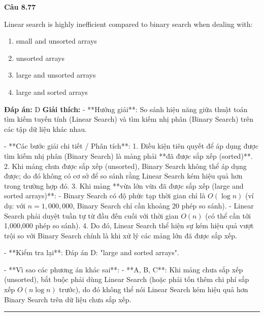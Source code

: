 \documentclass[11pt,a4paper]{article}
\newenvironment{question}[1]{%
  \par\vspace{1em}\noindent\textbf{\large Câu #1}\par\vspace{0.4em}
}{%
  \par\vspace{1em}\hrule\vspace{0.6em}
}
\newenvironment{choices}{%
  \begin{enumerate}[label=\textbf{\Alph*.},leftmargin=2.2em,itemsep=2pt,topsep=3pt]
}{%
  \end{enumerate}
}
\newcommand{\choice}{\item}
\begin{document}
\begin{question}{8.77}
Linear search is highly inefficient compared to binary search when dealing with:
\begin{choices}
\choice small and unsorted arrays
\choice unsorted arrays
\choice large and unsorted arrays
\choice large and sorted arrays
\end{choices}
\textbf{Đáp án:} D
\textbf{Giải thích:} - **Hướng giải**:
  So sánh hiệu năng giữa thuật toán tìm kiếm tuyến tính (Linear Search) và tìm kiếm nhị phân (Binary Search) trên các tập dữ liệu khác nhau.

- **Các bước giải chi tiết / Phân tích**:
  1. Điều kiện tiên quyết để áp dụng được tìm kiếm nhị phân (Binary Search) là mảng phải **đã được sắp xếp (sorted)**.
  2. Khi mảng chưa được sắp xếp (unsorted), Binary Search không thể áp dụng được; do đó không có cơ sở để so sánh rằng Linear Search kém hiệu quả hơn trong trường hợp đó.
  3. Khi mảng **vừa lớn vừa đã được sắp xếp (large and sorted arrays)**:
     - Binary Search có độ phức tạp thời gian chỉ là \(O(\log n)\) (ví dụ: với \(n = 1{,}000{,}000\), Binary Search chỉ cần khoảng 20 phép so sánh).
     - Linear Search phải duyệt tuần tự từ đầu đến cuối với thời gian \(O(n)\) (có thể cần tới 1,000,000 phép so sánh).
  4. Do đó, Linear Search thể hiện sự kém hiệu quả vượt trội so với Binary Search chính là khi xử lý các mảng lớn đã được sắp xếp.

- **Kiểm tra lại**:
  Đáp án D: "large and sorted arrays".

- **Vì sao các phương án khác sai**:
  - **A, B, C**: Khi mảng chưa sắp xếp (unsorted), bắt buộc phải dùng Linear Search (hoặc phải tốn thêm chi phí sắp xếp \(O(n \log n)\) trước), do đó không thể nói Linear Search kém hiệu quả hơn Binary Search trên dữ liệu chưa sắp xếp.
\end{question}
\end{document}
